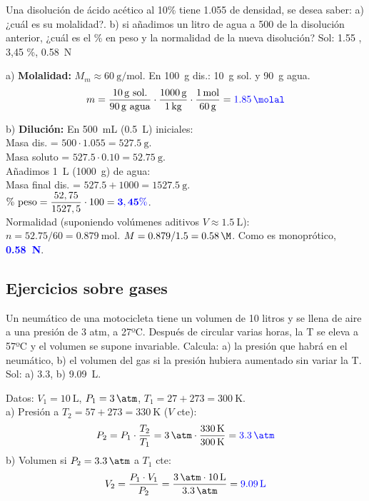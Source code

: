 \begin{exercise}
    Una disolución de ácido acético al 10\% tiene \qty{1.055}{\gpcc} de densidad, se desea saber:
    a) ¿cuál es su molalidad?. b) si añadimos un litro de agua a \qty{500}{\cc} de la disolución anterior, ¿cuál es el \% en peso y la normalidad de la nueva disolución? Sol: \qty{1.55}{\molal} , 3,45 \%, \qty{0.58}{\N}
    \begin{solu}
        a) \textbf{Molalidad:} $M_m \approx \qty{60}{\g\per\mol}$. En \qty{100}{\g} dis.: \qty{10}{\g} sol. y \qty{90}{\g} agua.
        \[ m = \dfrac{\qty{10}{\g} \text{ sol.}}{\qty{90}{\g} \text{ agua}} \cdot \dfrac{\qty{1000}{\g}}{\qty{1}{\kg}} \cdot \dfrac{\qty{1}{\mol}}{\qty{60}{\g}} = \mathbf{\textcolor{blue}{\qty{1.85}{\molal}}} \]

        b) \textbf{Dilución:} En \qty{500}{\mL} (\qty{0.5}{\L}) iniciales: \\
        Masa dis. = $500 \cdot 1.055 = \qty{527.5}{\g}$. \\
        Masa soluto = $527.5 \cdot 0.10 = \qty{52.75}{\g}$. \\
        Añadimos \qty{1}{\L} (\qty{1000}{\g}) de agua: \\
        Masa final dis. = $527.5 + 1000 = \qty{1527.5}{\g}$. \\
        $\% \text{ peso} = \dfrac{52,75}{1527,5} \cdot 100 = \mathbf{\textcolor{blue}{3,45 \%}}$. \\
        Normalidad (suponiendo volúmenes aditivos $V \approx \qty{1.5}{\L}$): \\
        $n = 52.75 / 60 = \qty{0.879}{\mol}$. $M = 0.879 / 1.5 = \qty{0.58}{\M}$. Como es monoprótico, \textbf{\textcolor{blue}{\qty{0.58}{\N}}}.
    \end{solu}
\end{exercise}

\subsection{Ejercicios sobre gases}

\begin{exercise}
    Un neumático de una motocicleta tiene un volumen de 10 litros y se llena de aire a una presión de 3 atm, a 27ºC. Después de circular varias horas, la T se eleva a 57ºC y el volumen se supone invariable. Calcula: a) la presión que habrá en el neumático, b) el volumen del gas si la presión hubiera aumentado sin variar la T.
    Sol: a) \qty{3.3}{\atm}, b) \qty{9.09}{\L}.

    \begin{solu}
        Datos: $V_1 = \qty{10}{\L}$, $P_1 = \qty{3}{\atm}$, $T_1 = 27 + 273 = \qty{300}{\K}$. \\
        a) Presión a $T_2 = 57 + 273 = \qty{330}{\K}$ ($V$ cte):
        \[ P_2 = P_1 \cdot \dfrac{T_2}{T_1} = \qty{3}{\atm} \cdot \dfrac{\qty{330}{\K}}{\qty{300}{\K}} = \mathbf{\textcolor{blue}{\qty{3,3}{\atm}}} \]
        b) Volumen si $P_2 = \qty{3,3}{\atm}$ a $T_1$ cte:
        \[ V_2 = \dfrac{P_1 \cdot V_1}{P_2} = \dfrac{\qty{3}{\atm} \cdot \qty{10}{\L}}{\qty{3,3}{\atm}} = \mathbf{\textcolor{blue}{\qty{9,09}{\L}}} \]
    \end{solu}
\end{exercise}

